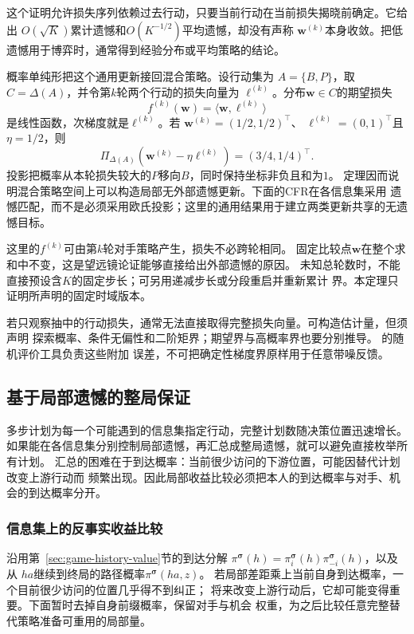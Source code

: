 这个证明允许损失序列依赖过去行动，只要当前行动在当前损失揭晓前确定。它给出
\(O(\sqrt{K})\)累计遗憾和\(O(K^{-1/2})\)平均遗憾，却没有声称
\(\bm{w}^{(k)}\)本身收敛。把低遗憾用于博弈时，通常得到经验分布或平均策略的结论。

概率单纯形把这个通用更新接回混合策略。设行动集为
\(A=\{B,P\}\)，取\(C=\Delta(A)\)，并令第\(k\)轮两个行动的损失向量为
\(\bm{\ell}^{(k)}\)。分布\(\bm{w}\in C\)的期望损失
\[
  f^{(k)}(\bm{w})
  =
  \langle\bm{w},\bm{\ell}^{(k)}\rangle
\]
是线性函数，次梯度就是\(\bm{\ell}^{(k)}\)。若
\(\bm{w}^{(k)}=(1/2,1/2)^{\top}\)、
\(\bm{\ell}^{(k)}=(0,1)^{\top}\)且\(\eta=1/2\)，则
\[
  \Pi_{\Delta(A)}
  \left(
    \bm{w}^{(k)}-\eta\bm{\ell}^{(k)}
  \right)
  =
  (3/4,1/4)^{\top}.
\]
投影把概率从本轮损失较大的\(P\)移向\(B\)，同时保持坐标非负且和为\(1\)。
定理因而说明混合策略空间上可以构造局部无外部遗憾更新。下面的CFR在各信息集采用
遗憾匹配，而不是必须采用欧氏投影；这里的通用结果用于建立两类更新共享的无遗憾目标。

这里的\(f^{(k)}\)可由第\(k\)轮对手策略产生，损失不必跨轮相同。
固定比较点\(\bm w\)在整个求和中不变，这是望远镜论证能够直接给出外部遗憾的原因。
未知总轮数时，不能直接预设含\(K\)的固定步长；可另用递减步长或分段重启并重新累计
界。本定理只证明所声明的固定时域版本。

若只观察抽中的行动损失，通常无法直接取得完整损失向量。可构造估计量，但须声明
探索概率、条件无偏性和二阶矩界；期望界与高概率界也要分别推导。
的随机评价工具负责这些附加
误差，不可把确定性梯度界原样用于任意带噪反馈。

\subsection{基于局部遗憾的整局保证}
\label{sec:game-local-to-global-regret}

多步计划为每一个可能遇到的信息集指定行动，完整计划数随决策位置迅速增长。
如果能在各信息集分别控制局部遗憾，再汇总成整局遗憾，就可以避免直接枚举所有计划。
汇总的困难在于到达概率：当前很少访问的下游位置，可能因替代计划改变上游行动而
频繁出现。因此局部收益比较必须把本人的到达概率与对手、机会的到达概率分开。

\subsubsection{信息集上的反事实收益比较}
\label{sec:game-counterfactual-comparison}

沿用第~\ref{sec:game-history-value}节的到达分解
\(\pi^{\bm\sigma}(h)=\pi_i^{\bm\sigma}(h)\pi_{-i}^{\bm\sigma}(h)\)，以及从
\(ha\)继续到终局的路径概率\(\pi^{\bm\sigma}(ha,z)\)。
若局部差距乘上当前自身到达概率，一个目前很少访问的位置几乎得不到纠正；
将来改变上游行动后，它却可能变得重要。下面暂时去掉自身前缀概率，保留对手与机会
权重，为之后比较任意完整替代策略准备可重用的局部量。

